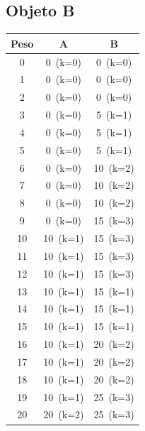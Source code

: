 \documentclass[12pt]{article}
\begin{document}
\begin{landscape}
\subsection*{Objeto B}
\begin{longtable}{ccc}
\toprule
Peso & A & B \\
\midrule
0 & \cellcolor{red!20}0~(k=0) & \cellcolor{red!20}0~(k=0) \\
1 & \cellcolor{red!20}0~(k=0) & \cellcolor{red!20}0~(k=0) \\
2 & \cellcolor{red!20}0~(k=0) & \cellcolor{red!20}0~(k=0) \\
3 & \cellcolor{red!20}0~(k=0) & \cellcolor{green!40}5~(k=1) \\
4 & \cellcolor{red!20}0~(k=0) & \cellcolor{green!40}5~(k=1) \\
5 & \cellcolor{red!20}0~(k=0) & \cellcolor{green!40}5~(k=1) \\
6 & \cellcolor{red!20}0~(k=0) & \cellcolor{green!40}10~(k=2) \\
7 & \cellcolor{red!20}0~(k=0) & \cellcolor{green!40}10~(k=2) \\
8 & \cellcolor{red!20}0~(k=0) & \cellcolor{green!40}10~(k=2) \\
9 & \cellcolor{red!20}0~(k=0) & \cellcolor{green!40}15~(k=3) \\
10 & \cellcolor{green!40}10~(k=1) & \cellcolor{green!40}15~(k=3) \\
11 & \cellcolor{green!40}10~(k=1) & \cellcolor{green!40}15~(k=3) \\
12 & \cellcolor{green!40}10~(k=1) & \cellcolor{green!40}15~(k=3) \\
13 & \cellcolor{green!40}10~(k=1) & \cellcolor{yellow!50}15~(k=1) \\
14 & \cellcolor{green!40}10~(k=1) & \cellcolor{yellow!50}15~(k=1) \\
15 & \cellcolor{green!40}10~(k=1) & \cellcolor{yellow!50}15~(k=1) \\
16 & \cellcolor{green!40}10~(k=1) & \cellcolor{green!40}20~(k=2) \\
17 & \cellcolor{green!40}10~(k=1) & \cellcolor{green!40}20~(k=2) \\
18 & \cellcolor{green!40}10~(k=1) & \cellcolor{green!40}20~(k=2) \\
19 & \cellcolor{green!40}10~(k=1) & \cellcolor{green!40}25~(k=3) \\
20 & \cellcolor{green!40}20~(k=2) & \cellcolor{green!40}25~(k=3) \\
\bottomrule
\end{longtable}
\end{landscape}
\end{document}
